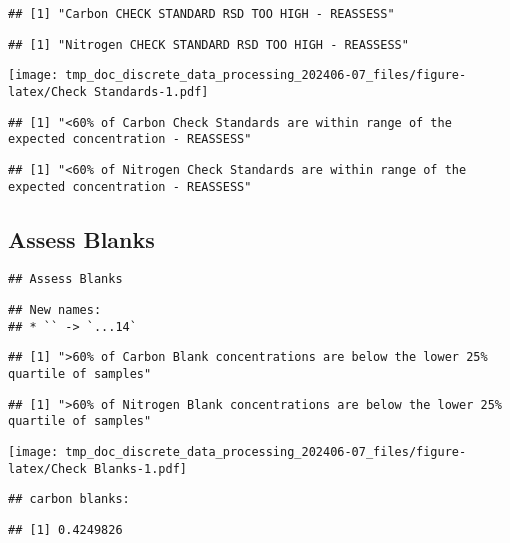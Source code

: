 \documentclass[
]{article}
\begin{document}
\begin{verbatim}
## [1] "Carbon CHECK STANDARD RSD TOO HIGH - REASSESS"
\end{verbatim}

\begin{verbatim}
## [1] "Nitrogen CHECK STANDARD RSD TOO HIGH - REASSESS"
\end{verbatim}

\texttt{[image: tmp\_doc\_discrete\_data\_processing\_202406-07\_files/figure-latex/Check Standards-1.pdf]}

\begin{verbatim}
## [1] "<60% of Carbon Check Standards are within range of the expected concentration - REASSESS"
\end{verbatim}

\begin{verbatim}
## [1] "<60% of Nitrogen Check Standards are within range of the expected concentration - REASSESS"
\end{verbatim}

\newpage

\hypertarget{assess-blanks}{%
\subsection{Assess Blanks}\label{assess-blanks}}

\begin{verbatim}
## Assess Blanks
\end{verbatim}

\begin{verbatim}
## New names:
## * `` -> `...14`
\end{verbatim}

\begin{verbatim}
## [1] ">60% of Carbon Blank concentrations are below the lower 25% quartile of samples"
\end{verbatim}

\begin{verbatim}
## [1] ">60% of Nitrogen Blank concentrations are below the lower 25% quartile of samples"
\end{verbatim}

\texttt{[image: tmp\_doc\_discrete\_data\_processing\_202406-07\_files/figure-latex/Check Blanks-1.pdf]}

\begin{verbatim}
## carbon blanks:
\end{verbatim}

\begin{verbatim}
## [1] 0.4249826
\end{verbatim}
\end{document}
